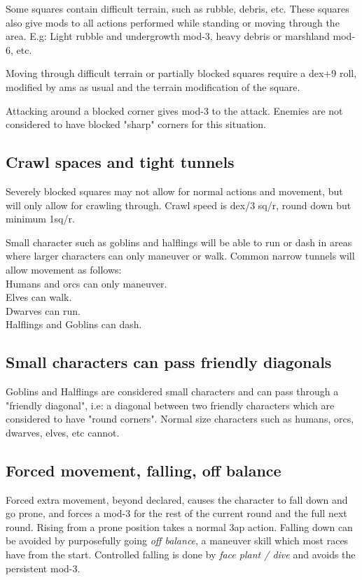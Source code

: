 Some squares contain difficult terrain, such as rubble, debris, etc. These squares also give mods to all actions performed while standing or moving through the area. E.g: Light rubble and undergrowth mod-3, heavy debris or marshland mod-6, etc.

Moving through difficult terrain or partially blocked squares require a dex+9 roll, modified by ams as usual and the terrain modification of the square.

Attacking around a blocked corner gives mod-3 to the attack. Enemies are not considered to have blocked "sharp" corners for this situation.


\subsection*{Crawl spaces and tight tunnels}
Severely blocked squares may not allow for normal actions and movement, but will only allow for crawling through. Crawl speed is dex/3 sq/r, round down but minimum 1sq/r.

Small character such as goblins and halflings will be able to run or dash in areas where larger characters can only maneuver or walk. 
Common narrow tunnels will allow movement as follows: \\
Humans and orcs can only maneuver. \\
Elves can walk. \\
Dwarves can run. \\
Halflings and Goblins can dash.


\subsection*{Small characters can pass friendly diagonals}
Goblins and Halflings are considered small characters and can pass through a "friendly diagonal", i.e: a diagonal between two friendly characters which are considered to have "round corners". 
Normal size characters such as humans, orcs, dwarves, elves, etc cannot.


\subsection*{Forced movement, falling, off balance}
Forced extra movement, beyond declared, causes the character to fall down and go prone, and forces a mod-3 for the rest of the current round and the full next round. Rising from a prone position takes a normal 3ap action. Falling down can be avoided by purposefully going \emph{off balance}, a maneuver skill which most races have from the start. Controlled falling is done by \emph{face plant / dive} and avoids the persistent mod-3.

